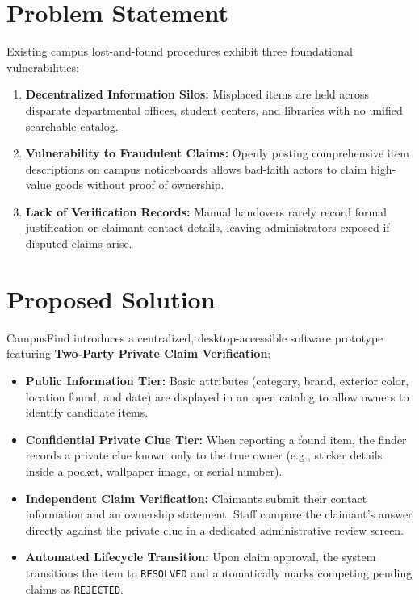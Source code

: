 \documentclass[11pt,a4paper]{article}
\begin{document}
\section{Problem Statement}
Existing campus lost-and-found procedures exhibit three foundational vulnerabilities:
\begin{enumerate}[label=\textbf{P\arabic*.}]
    \item \textbf{Decentralized Information Silos:} Misplaced items are held across disparate departmental offices, student centers, and libraries with no unified searchable catalog.
    \item \textbf{Vulnerability to Fraudulent Claims:} Openly posting comprehensive item descriptions on campus noticeboards allows bad-faith actors to claim high-value goods without proof of ownership.
    \item \textbf{Lack of Verification Records:} Manual handovers rarely record formal justification or claimant contact details, leaving administrators exposed if disputed claims arise.
\end{enumerate}

\section{Proposed Solution}
CampusFind introduces a centralized, desktop-accessible software prototype featuring \textbf{Two-Party Private Claim Verification}:
\begin{itemize}
    \item \textbf{Public Information Tier:} Basic attributes (category, brand, exterior color, location found, and date) are displayed in an open catalog to allow owners to identify candidate items.
    \item \textbf{Confidential Private Clue Tier:} When reporting a found item, the finder records a private clue known only to the true owner (e.g., sticker details inside a pocket, wallpaper image, or serial number).
    \item \textbf{Independent Claim Verification:} Claimants submit their contact information and an ownership statement. Staff compare the claimant's answer directly against the private clue in a dedicated administrative review screen.
    \item \textbf{Automated Lifecycle Transition:} Upon claim approval, the system transitions the item to \texttt{RESOLVED} and automatically marks competing pending claims as \texttt{REJECTED}.
\end{itemize}
\end{document}
